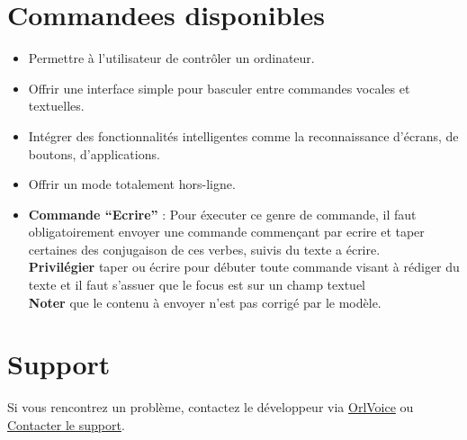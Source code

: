 \documentclass[a4paper,12pt]{article}
\begin{document}
	\section{Commandees disponibles}
		\begin{itemize}
			\item Permettre à l’utilisateur de contrôler un ordinateur.
			\item Offrir une interface simple pour basculer entre commandes vocales et textuelles.
			\item Intégrer des fonctionnalités intelligentes comme la reconnaissance d’écrans, de boutons, d’applications.
			\item Offrir un mode totalement hors-ligne.
			\item \textbf{Commande \enquote{Ecrire}} : Pour éxecuter ce genre de commande, il faut obligatoirement envoyer une commande commençant par ecrire et taper certaines des conjugaison de ces verbes, suivis du texte a écrire.\\ \textbf{Privilégier} taper ou écrire pour débuter toute commande visant à rédiger du texte et il faut s'assuer que le focus est sur un champ textuel \\ \textbf{Noter} que le contenu à envoyer n'est pas corrigé par le modèle.
		\end{itemize}
	\section{Support}
	Si vous rencontrez un problème, contactez le développeur via \href{https://github.com/OrlCheetah/computer_vision}{OrlVoice} ou \href{mailto:rotacobach@gmail.com}{Contacter le support}.
	
\end{document}
